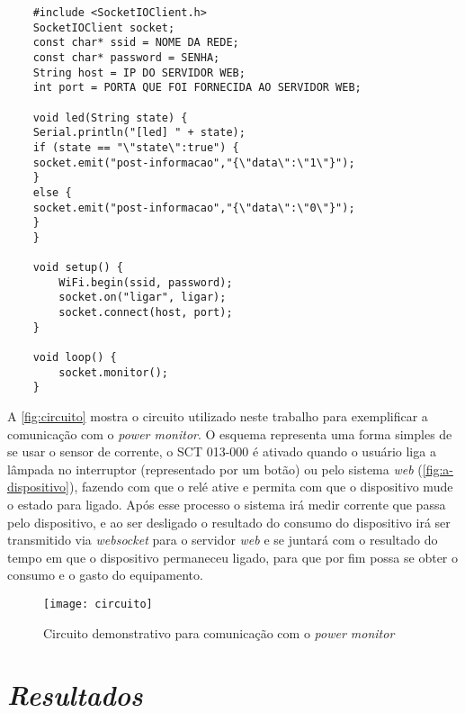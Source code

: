 \addtocounter{footnote}{-2}
\addtocounter{footnote}{1}
\addtocounter{footnote}{1}

\begin{lstlisting}
	#include <SocketIOClient.h>
	SocketIOClient socket;
	const char* ssid = NOME DA REDE;
	const char* password = SENHA;
	String host = IP DO SERVIDOR WEB;
	int port = PORTA QUE FOI FORNECIDA AO SERVIDOR WEB;	

	void led(String state) {
	Serial.println("[led] " + state);
	if (state == "\"state\":true") {
	socket.emit("post-informacao","{\"data\":\"1\"}");
	}
	else {
	socket.emit("post-informacao","{\"data\":\"0\"}");
	}
	}

	void setup() {
		WiFi.begin(ssid, password);
  		socket.on("ligar", ligar);  
  		socket.connect(host, port);
	}

	void loop() {
  		socket.monitor();    
	}
\end{lstlisting}

A \autoref{fig:circuito} mostra o circuito utilizado neste trabalho para exemplificar a comunicação com o \textit{power monitor}.
O esquema representa uma forma simples de se usar o sensor de corrente, o SCT 013-000 é ativado quando o usuário liga a lâmpada no interruptor
(representado por um botão) ou pelo sistema \textit{web} (\autoref{fig:a-dispositivo}), fazendo com que o relé ative e permita com que o dispositivo 
mude o estado para ligado. Após esse processo o sistema irá medir corrente que passa pelo dispositivo, e ao ser desligado o resultado
do consumo do dispositivo irá ser transmitido via \textit{websocket} para o servidor \textit{web} e se juntará com o resultado do tempo em que o dispositivo permaneceu
ligado, para que por fim possa se obter o consumo e o gasto do equipamento. 

\begin{figure}[h!]
	\texttt{[image: circuito]}
	\centering
	\caption[Circuito demonstrativo para comunicação com o \textit{power monitor}]{Circuito demonstrativo para comunicação com o \textit{power monitor}}
	\label{fig:circuito}  
\end{figure}
\FloatBarrier

\section[\textit{Resultados}]{\textit{Resultados}}\label{resultados-sec}

